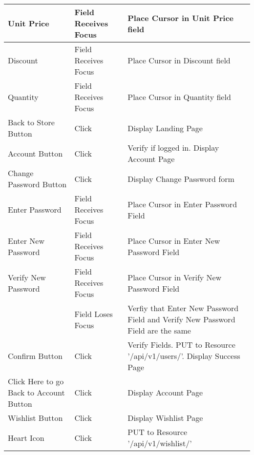 \documentclass[12pt]{article}
\begin{document}
\begin{center}
	\begin{tabular}{ m{1.5in} | m{1.5in} | m{1.5in} }
	Unit Price & Field Receives Focus & Place Cursor in Unit Price field \\
	\hline
	Discount & Field Receives Focus & Place Cursor in Discount field \\
	\hline
	Quantity & Field Receives Focus & Place Cursor in Quantity field \\
	\hline
	Back to Store Button & Click & Display Landing Page \\
	\hline
	Account Button & Click & Verify if logged in. Display Account Page \\
	\hline
	Change Password Button & Click & Display Change Password form \\
	\hline
	Enter Password & Field Receives Focus & Place Cursor in Enter Password Field \\
	\hline
	Enter New Password & Field Receives Focus & Place Cursor in Enter New Password Field \\
	\hline
	Verify New Password & Field Receives Focus & Place Cursor in Verify New Password Field \\
	& Field Loses Focus & Verfiy that Enter New Password Field and Verify New Password Field are the same \\
	\hline
	Confirm Button & Click & Verify Fields. PUT to Resource '/api/v1/users/'. Display Success Page \\
	\hline
	Click Here to go Back to Account Button & Click & Display Account Page \\
	\hline
	Wishlist Button & Click & Display Wishlist Page \\
	\hline
	Heart Icon & Click & PUT to Resource '/api/v1/wishlist/' \\	
	\end{tabular}
		
	\newpage	
	

\end{center}
\end{document}
